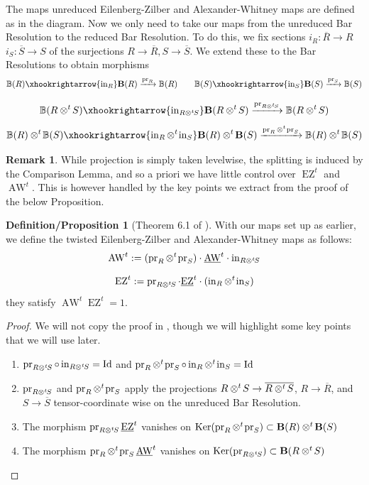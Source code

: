 \documentclass{article}
\newcommand{\twisten}{\otimes^t\hspace{-1pt}}
\newcommand{\awt}{\operatorname{AW}^t}
\newcommand{\ezt}{\operatorname{EZ}^t}
\newcommand{\pr}{\operatorname{pr}}
\newcommand{\inc}{\operatorname{in}}
\newcommand{\bezt}{\underline{\operatorname{EZ}}^t}
\newcommand{\bawt}{\underline{\operatorname{AW}}^t}
\theoremstyle{plain}
\theoremstyle{definition}
\newtheorem{definitionproposition}[theorem]{Definition/Proposition}
\newtheorem{remark}[theorem]{Remark}
\begin{document}
The maps unreduced Eilenberg-Zilber and Alexander-Whitney maps are defined as in the diagram. Now we only need to take our maps from the unreduced Bar Resolution to the reduced Bar Resolution. To do this, we fix sections $i_R: \overline{R} \rightarrow R$ $i_S: \overline{S} \rightarrow S$ of the surjections $R \rightarrow \overline{R}, S \rightarrow \overline{S}$. We extend these to the Bar Resolutions to obtain morphisms
$$\mathbb{B}(R) \xhookrightarrow{\inc_R} \mathbf{B}(R) \xrightarrow{\pr_R} \mathbb{B}(R)  \hspace{20pt} \mathbb{B}(S) \xhookrightarrow{\inc_S} \mathbf{B}(S) \xrightarrow{\pr_S} \mathbb{B}(S) $$


$$\mathbb{B}(R \twisten S) \xhookrightarrow{\inc_{R \twisten S}} \mathbf{B}(R \twisten S) \xrightarrow{\pr_{R \twisten S}} \mathbb{B}(R \twisten S) $$
$$\mathbb{B}(R) \twisten \mathbb{B}(S) \xhookrightarrow{\inc_{R} \twisten \inc_{S}}\mathbf{B}(R) \twisten \mathbf{B}(S)\xrightarrow{\pr_{R} \twisten \pr_S} \mathbb{B}(R) \twisten \mathbb{B}(S)$$
\begin{remark} While projection is simply taken levelwise, the splitting is induced by the Comparison Lemma, and so a priori we have little control over $\ezt$ and $\awt$. This is however handled by the key points we extract from the proof of the below Proposition. \end{remark}
\begin{definitionproposition}[Theorem 6.1 of \cite{Shepler}]\label{proofoftwist} With our maps set up as earlier, we define the twisted Eilenberg-Zilber and Alexander-Whitney maps as follows:
$$\awt := (\pr_{R} \twisten \pr_S) \cdot \bawt \cdot \inc_{R \twisten S}$$

$$\ezt := \pr_{R \twisten S} \cdot \bezt \cdot (\inc_{R} \twisten \inc_{S})$$
they satisfy $\awt \ezt = 1$.
\end{definitionproposition}
\begin{proof} We will not copy the proof in \cite{Shepler}, though we will highlight some key points that we will use later. \begin{enumerate} 
\item $\pr_{R \twisten S} \circ \inc_{R \twisten S} = \operatorname{Id}$ and $\pr_R \twisten \pr_S \circ \inc_R \twisten \inc_S = \operatorname{Id}$
\item $\pr_{R \twisten S}$ and $\pr_R \twisten \pr_S$ apply the projections $R \twisten S \rightarrow \overline{R \twisten S}$, $R \rightarrow \overline{R}$, and  $S \rightarrow \overline{S}$ tensor-coordinate wise on the unreduced Bar Resolution. 
\item The morphism $\pr_{R \twisten S} \bezt$ vanishes on $\operatorname{Ker}(\pr_R \twisten \pr_S) \subset \mathbf{B}(R) \twisten \mathbf{B}(S)$
\item The morphism $\pr_{R} \twisten \pr_{S} \bawt$ vanishes on $\operatorname{Ker}(\pr_{R \twisten S}) \subset \mathbf{B}(R \twisten S)$
\end{enumerate}
\end{proof}
\end{document}
